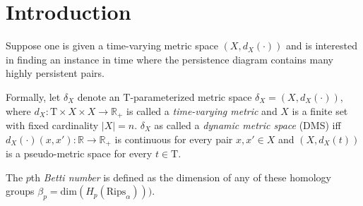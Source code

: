 \documentclass[10pt]{article}
\begin{document}



\section{Introduction}




Suppose one is given a time-varying metric space $(X, d_X(\cdot))$ and is interested in finding an instance in time where the persistence diagram contains many highly persistent pairs. 


Formally, let $\delta_X$ denote an $\mathrm{T}$-parameterized metric space $\delta_X = ( X, d_X(\cdot) )$, where $d_X: \mathrm{T} \times X \times X \to \mathbb{R}_+$ is called a \emph{time-varying metric}  and $X$ is a finite set with fixed cardinality $\lvert X \rvert = n$. $\delta_X$ as called a \emph{dynamic metric space} (DMS) iff $d_X(\cdot)(x, x'): \mathbb{R} \to \mathbb{R}_{+}$ is continuous for every pair $x, x' \in X$ and $(X, d_X(t))$ is a pseudo-metric space for every $t \in \mathrm{T}$. 


The $p$th \emph{Betti number} is defined as the dimension of any of these homology groups $\beta_p = \mathrm{dim}(H_p(\mathrm{Rips}_{\alpha})))$. 
\end{document}

